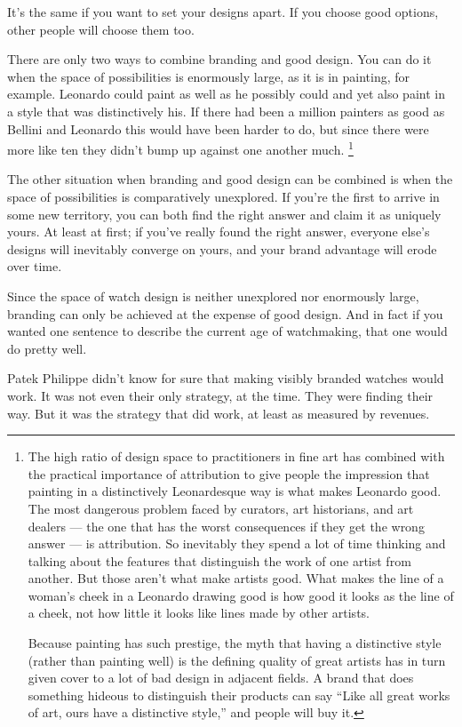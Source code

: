 \documentclass[12pt]{book}
\begin{document}
It's the same if you want to set your designs apart. If you choose good
options, other people will choose them too.

There are only two ways to combine branding and good design. You can do
it when the space of possibilities is enormously large, as it is in
painting, for example. Leonardo could paint as well as he possibly could
and yet also paint in a style that was distinctively his. If there had
been a million painters as good as Bellini and Leonardo this would have
been harder to do, but since there were more like ten they didn't bump
up against one another much. \footnote{The high ratio of design space to practitioners in fine art has
combined with the practical importance of attribution to give people the
impression that painting in a distinctively Leonardesque way is what
makes Leonardo good. The most dangerous problem faced by curators, art
historians, and art dealers --- the one that has the worst consequences
if they get the wrong answer --- is attribution. So inevitably they
spend a lot of time thinking and talking about the features that
distinguish the work of one artist from another. But those aren't what
make artists good. What makes the line of a woman's cheek in a Leonardo
drawing good is how good it looks as the line of a cheek, not how little
it looks like lines made by other artists.

Because painting has such prestige, the myth that having a distinctive
style (rather than painting well) is the defining quality of great
artists has in turn given cover to a lot of bad design in adjacent
fields. A brand that does something hideous to distinguish their
products can say ``Like all great works of art, ours have a distinctive
style,'' and people will buy it.}

The other situation when branding and good design can be combined is
when the space of possibilities is comparatively unexplored. If you're
the first to arrive in some new territory, you can both find the right
answer and claim it as uniquely yours. At least at first; if you've
really found the right answer, everyone else's designs will inevitably
converge on yours, and your brand advantage will erode over time.

Since the space of watch design is neither unexplored nor enormously
large, branding can only be achieved at the expense of good design. And
in fact if you wanted one sentence to describe the current age of
watchmaking, that one would do pretty well.

Patek Philippe didn't know for sure that making visibly branded watches
would work. It was not even their only strategy, at the time. They were
finding their way. But it was the strategy that did work, at least as
measured by revenues.
\end{document}
